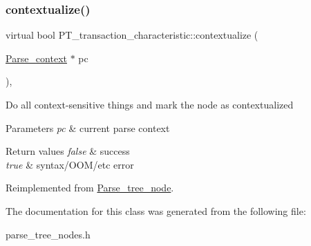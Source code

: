 \subsubsection{\texorpdfstring{contextualize()}{contextualize()}}
{\footnotesize\ttfamily virtual bool P\+T\+\_\+transaction\+\_\+characteristic\+::contextualize (\begin{DoxyParamCaption}\item[{\mbox{\hyperlink{structParse__context}{Parse\+\_\+context}} $\ast$}]{pc }\end{DoxyParamCaption})\hspace{0.3cm}{\ttfamily [inline]}, {\ttfamily [virtual]}}

Do all context-\/sensitive things and mark the node as contextualized


\begin{DoxyParams}{Parameters}
{\em pc} & current parse context\\
\hline
\end{DoxyParams}

\begin{DoxyRetVals}{Return values}
{\em false} & success \\
\hline
{\em true} & syntax/\+O\+O\+M/etc error \\
\hline
\end{DoxyRetVals}


Reimplemented from \mbox{\hyperlink{classParse__tree__node_a22d93524a537d0df652d7efa144f23da}{Parse\+\_\+tree\+\_\+node}}.



The documentation for this class was generated from the following file\+:\begin{DoxyCompactItemize}
\item 
parse\+\_\+tree\+\_\+nodes.\+h\end{DoxyCompactItemize}
